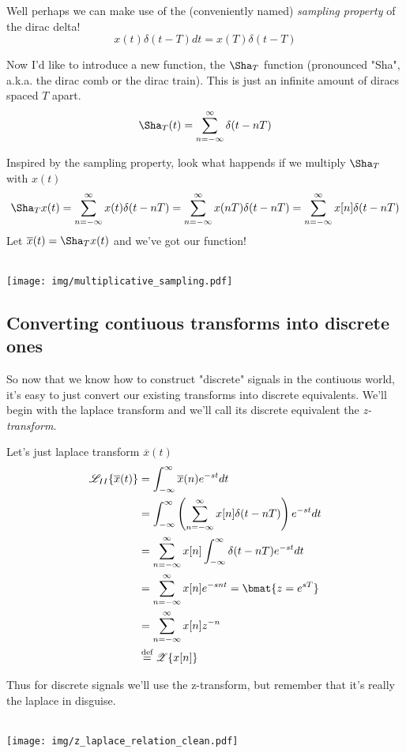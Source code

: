 \documentclass{article}
\newcommand{\0}{{\mathbf{0}}}
\newcommand{\texteq}[1]{\ensuremath{\stackrel{\text{#1}}{=}}}
\begin{document}
Well perhaps we can make use of the (conveniently named) \textit{sampling property} of the dirac delta!
$$ x(t)\delta(t-T) dt = x(T)\delta(t-T) $$

Now I'd like to introduce a new function, the $\Sha_T$ function (pronounced "Sha", a.k.a. the dirac comb or the dirac train).
This is just an infinite amount of diracs spaced $T$ apart.
$$ \Sha_T(t) = \sum^{\infty}_{n=-\infty} \delta(t - nT) $$

Inspired by the sampling property, look what happends if we
multiply $\Sha_T$ with $x(t)$
$$ \Sha_T x(t) = \sum^{\infty}_{n=-\infty} x(t)\delta(t-nT) = \sum^{\infty}_{n=-\infty} x(nT)\delta(t-nT) = \sum^{\infty}_{n=-\infty} x[n]\delta(t - nT) $$
Let $\overline{x}(t) = \Sha_T x(t)$ and we've got our function!
\\\\
\centerline{
  \texttt{[image: img/multiplicative\_sampling.pdf]}
}

\subsection{Converting contiuous transforms into discrete ones}
So now that we know how to construct "discrete" signals in the contiuous world, it's easy
to just convert our existing transforms into discrete equivalents. We'll begin with the laplace transform and we'll call its
discrete equivalent the \textit{z-transform}.

Let's just laplace transform $\overline{x}(t)$
\begin{equation*}
  \begin{split}
    \mathscr{L}_{II}\{ \overline{x}(t) \} &= \int^{\infty}_{-\infty} \overline{x}(n) e^{-st} dt \\
    &= \int^{\infty}_{-\infty} \left( \sum^{\infty}_{n=-\infty} x[n] \delta(t - nT) \right) e^{-st} dt\\
    &= \sum^{\infty}_{n=-\infty} x[n] \int^{\infty}_{-\infty} \delta(t-nT)e^{-st} dt\\
    &= \sum^{\infty}_{n=-\infty} x[n]e^{-snt} = \bmat{z = e^{sT}}\\
    &= \sum^{\infty}_{n=-\infty} x[n]z^{-n}\\
    &\texteq{def} \mathscr{Z}\{ x[n] \}
  \end{split}
\end{equation*}

Thus for discrete signals we'll use the z-transform, but remember that it's really the laplace in disguise.
\\\\
\centerline{
  \texttt{[image: img/z\_laplace\_relation\_clean.pdf]}
}
\end{document}
